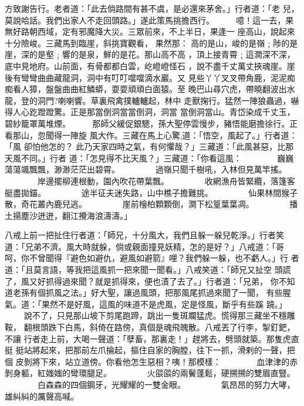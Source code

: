 \begin{pinyinscope}
{方致謝告行。老者道：「此去倘路間有甚不虞，是必還來茅舍。」行者道：「老
兒，莫說哈話。我們出家人不走回頭路。」遂此策馬挑擔西行。
　　
噫！這一去，果無好路朝西域，定有邪魔降大災。三眾前來，不上半日，果逢一
座高山，說起來十分險峻。三藏馬到臨崖，斜挑寶觀看， 果然那：
高的是山，峻的是嶺﹔陟的是崖，深的是壑﹔響的是泉，鮮的是花。那山高不高
，頂上接青霄﹔這澗深不深，底中見地府。山前面，有骨都都白雲，屹嶝嶝怪石
，說不盡千丈萬丈挾魂崖。崖後有彎彎曲曲藏龍洞，洞中有叮叮噹噹滴水巖。又
見些丫丫叉叉帶角鹿，泥泥痴痴看人獐，盤盤曲曲紅鱗蟒，耍耍頑頑白面猿。至
晚巴山尋穴虎，帶曉翻波出水龍，登的洞門?喇喇響。草裏飛禽撲轤轤起，林中
走獸掬行。猛然一陣狼蟲過，嚇得人心趷蹬蹬驚。正是那當倒洞當當倒洞，洞當
當倒洞當山。青岱染成千丈玉，碧紗籠罩萬堆煙。
　　
那師父緩促銀驄，孫大聖停雲慢步，豬悟能磨擔徐行。正看那山，忽聞得一陣旋
風大作。三藏在馬上心驚,道：「悟空，風起了。」行者道：「風 卻怕他怎的？
此乃天家四時之氣，有何懼哉？」三藏道：「此風甚惡，比那天風不同。」行者
道：「怎見得不比天風？」三藏道：「你看這風：
　　　　巍巍蕩蕩颯飄飄，渺渺茫茫出碧霄。
　　　　過嶺只聞千樹吼，入林但見萬竿搖。
　　　　岸邊擺柳連根動，園內吹花帶葉飄。
　　　　收網漁舟皆緊纜，落篷客艇盡拋錨。
　　　　途半征夫迷失路，山中樵子擔難挑。
　　　　仙果林間猴子散，奇花叢內鹿兒逃。
　　　　崖前檜柏顆顆倒，澗下松篁葉葉凋。
　　　　播土揚塵沙迸迸，翻江攪海浪濤濤。」

八戒上前一把扯住行者道：「師兄，十分風大，我們且躲一躲兒乾淨。」行者笑
道：「兄弟不濟。風大時就躲，倘或親面撞見妖精，怎的是好？」八戒道：「哥
呵，你不曾聞得『避色如避仇，避風如避箭』哩？我們躲一躲，也不虧人。」行
者道：「且莫言語，等我把這風抓一把來聞一聞看。」八戒笑道：「師兄又扯空
頭謊了，風又好抓得過來聞？就是抓得來，便也漬了去了。」行者道：「兄弟，
你不知道老孫有個抓風之法。」好大聖，讓過風頭，把那風尾抓過來聞了一聞，
有些腥氣。道：「果然不是好風，這風的味道不是虎風，定是怪風，斷乎有些蹊
蹺。」
　　
說不了，只見那山坡下剪尾跑蹄，跳出一隻斑斕猛虎。慌得那三藏坐不穩雕鞍，
翻根頭跌下白馬，斜倚在路傍，真個是魂飛魄散。八戒丟了行李，掣釘鈀，不讓
行者走上前，大喝一聲道：「孽畜，那裏走！」趕將去，劈頭就築。那隻虎直挺
挺站將起來，把那前左爪掄起，摳住自家的胸膛，往下一抓，滑剌的一聲，把個
皮剝將下來，站立道傍。你看他怎生惡相？咦！那模樣：
　　　　血津津的赤剝身軀，紅媸媸的彎環腿足。
　　　　火燄燄的兩鬢蓬鬆，硬搠搠的雙眉直豎。
　　　　白森森的四個鋼牙，光耀耀的一雙金眼。
　　　　氣昂昂的努力大哮，雄糾糾的厲聲高喊。

}
\end{pinyinscope}
